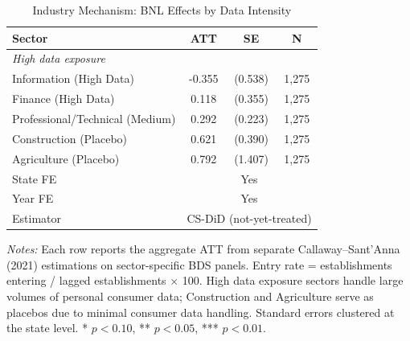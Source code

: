 \begin{table}[H]
\centering
\caption{Industry Mechanism: BNL Effects by Data Intensity}
\label{tab:industry}
\begin{threeparttable}
\begin{tabular}{lccc}
\toprule
Sector & ATT & SE & N \\
\midrule
\multicolumn{4}{l}{\textit{High data exposure}} \\
Information (High Data) & -0.355 & (0.538) & 1,275 \\
Finance (High Data) & 0.118 & (0.355) & 1,275 \\
Professional/Technical (Medium) & 0.292 & (0.223) & 1,275 \\
Construction (Placebo) & 0.621 & (0.390) & 1,275 \\
Agriculture (Placebo) & 0.792 & (1.407) & 1,275 \\
\midrule
State FE & \multicolumn{3}{c}{Yes} \\
Year FE & \multicolumn{3}{c}{Yes} \\
Estimator & \multicolumn{3}{c}{CS-DiD (not-yet-treated)} \\
\bottomrule
\end{tabular}
\begin{tablenotes}[flushleft]
\small
\item \textit{Notes:} Each row reports the aggregate ATT from separate Callaway--Sant'Anna (2021) estimations on sector-specific BDS panels. Entry rate = establishments entering / lagged establishments $\times$ 100. High data exposure sectors handle large volumes of personal consumer data; Construction and Agriculture serve as placebos due to minimal consumer data handling. Standard errors clustered at the state level. * $p<0.10$, ** $p<0.05$, *** $p<0.01$.
\end{tablenotes}
\end{threeparttable}
\end{table}
